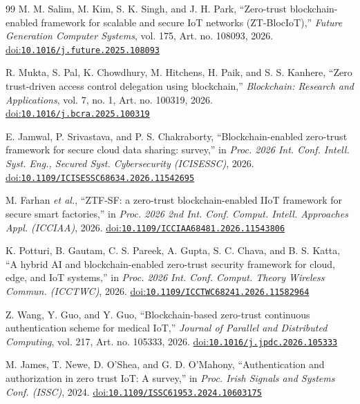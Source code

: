 \begin{thebibliography}{99}
M. M. Salim, M. Kim, S. K. Singh, and J. H. Park, ``Zero-trust blockchain-enabled framework for scalable and secure IoT networks (ZT-BlocIoT),'' \emph{Future Generation Computer Systems}, vol. 175, Art. no. 108093, 2026. \href{https://doi.org/10.1016/j.future.2025.108093}{doi:\nolinkurl{10.1016/j.future.2025.108093}}

R. Mukta, S. Pal, K. Chowdhury, M. Hitchens, H. Paik, and S. S. Kanhere, ``Zero trust-driven access control delegation using blockchain,'' \emph{Blockchain: Research and Applications}, vol. 7, no. 1, Art. no. 100319, 2026. \href{https://doi.org/10.1016/j.bcra.2025.100319}{doi:\nolinkurl{10.1016/j.bcra.2025.100319}}

E. Jamwal, P. Srivastava, and P. S. Chakraborty, ``Blockchain-enabled zero-trust framework for secure cloud data sharing: survey,'' in \emph{Proc. 2026 Int. Conf. Intell. Syst. Eng., Secured Syst. Cybersecurity (ICISESSC)}, 2026. \href{https://doi.org/10.1109/ICISESSC68634.2026.11542695}{doi:\nolinkurl{10.1109/ICISESSC68634.2026.11542695}}

M. Farhan \emph{et al.}, ``ZTF-SF: a zero-trust blockchain-enabled IIoT framework for secure smart factories,'' in \emph{Proc. 2026 2nd Int. Conf. Comput. Intell. Approaches Appl. (ICCIAA)}, 2026. \href{https://doi.org/10.1109/ICCIAA68481.2026.11543806}{doi:\nolinkurl{10.1109/ICCIAA68481.2026.11543806}}

K. Potturi, B. Gautam, C. S. Pareek, A. Gupta, S. C. Chava, and B. S. Katta, ``A hybrid AI and blockchain-enabled zero-trust security framework for cloud, edge, and IoT systems,'' in \emph{Proc. 2026 Int. Conf. Comput. Theory Wireless Commun. (ICCTWC)}, 2026. \href{https://doi.org/10.1109/ICCTWC68241.2026.11582964}{doi:\nolinkurl{10.1109/ICCTWC68241.2026.11582964}}

Z. Wang, Y. Guo, and Y. Guo, ``Blockchain-based zero-trust continuous authentication scheme for medical IoT,'' \emph{Journal of Parallel and Distributed Computing}, vol. 217, Art. no. 105333, 2026. \href{https://doi.org/10.1016/j.jpdc.2026.105333}{doi:\nolinkurl{10.1016/j.jpdc.2026.105333}}

M. James, T. Newe, D. O'Shea, and G. D. O'Mahony, ``Authentication and authorization in zero trust IoT: A survey,'' in \emph{Proc. Irish Signals and Systems Conf. (ISSC)}, 2024. \href{https://doi.org/10.1109/ISSC61953.2024.10603175}{doi:\nolinkurl{10.1109/ISSC61953.2024.10603175}}


\end{thebibliography}
